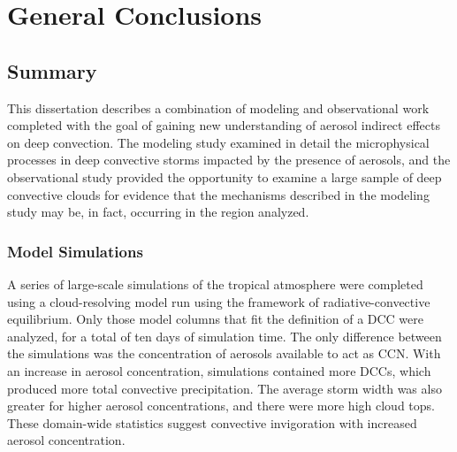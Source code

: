 \section{General Conclusions}

\subsection{Summary}
This dissertation describes a combination of modeling and observational work completed with the goal of gaining new understanding of aerosol indirect effects on deep convection.  The modeling study examined in detail the microphysical processes in deep convective storms impacted by the presence of aerosols, and the observational study provided the opportunity to examine a large sample of deep convective clouds for evidence that the mechanisms described in the modeling study may be, in fact, occurring in the region analyzed.

\subsubsection{Model Simulations}
A series of large-scale simulations of the tropical atmosphere were completed using a cloud-resolving model run using the framework of radiative-convective equilibrium.  Only those model columns that fit the definition of a DCC were analyzed, for a total of ten days of simulation time.  The only difference between the simulations was the concentration of aerosols available to act as CCN.  With an increase in aerosol concentration, simulations contained more DCCs, which produced more total convective precipitation.  The average storm width was also greater for higher aerosol concentrations, and there were more high cloud tops.  These domain-wide statistics suggest convective invigoration with increased aerosol concentration.


